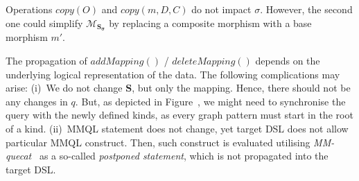 Operations $\textit{copy}(O)$ and $\textit{copy}(m, D, C)$ do not impact $\sigma$. However, the second one could simplify $\mathcal{M}_\mathbf{S_\sigma}$ by replacing a composite morphism with a base morphism $m'$.

The propagation of $\textit{addMapping}()$ / $\textit{deleteMapping}()$ depends on the underlying logical representation of the data. The following complications may arise: 
(i)~We do not change $\mathbf{S}$, but only the mapping. Hence, there should not be any changes in $q$. But, as depicted in Figure~, we might need to synchronise the query with the newly defined kinds, as every graph pattern must start in the root of a kind.  
(ii)~MMQL statement does not change, yet target DSL does not allow particular MMQL construct. Then, such construct is evaluated utilising \textit{MM-quecat}~\citep{mm_quecat} as a so-called \textit{postponed statement}, which is not propagated into the target DSL. 




